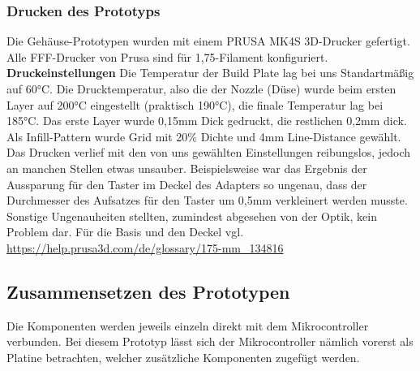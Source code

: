\documentclass[]{article}
\begin{document}
\subsubsection{Drucken des Prototyps}
Die Gehäuse-Prototypen wurden mit einem \glqq PRUSA MK4S\grqq{} 3D-Drucker gefertigt. Alle FFF-Drucker von Prusa sind für 1,75-Filament konfiguriert.
\vspace{4mm}\newline
\textbf{Druckeinstellungen} \newline
Die Temperatur der Build Plate lag bei uns Standartmäßig auf 60°C. Die Drucktemperatur, also die der Nozzle (Düse) wurde beim ersten Layer auf 200°C eingestellt (praktisch 190°C), die finale Temperatur lag bei 185°C. \newline
Das erste Layer wurde 0,15mm Dick gedruckt, die restlichen 0,2mm dick. \newline
Als Infill-Pattern wurde \glqq Grid\grqq{} mit 20\% Dichte und 4mm Line-Distance gewählt. \newline
Das Drucken verlief mit den von uns gewählten Einstellungen reibungslos, jedoch an manchen Stellen etwas unsauber. Beispielsweise war das Ergebnis der Aussparung für den Taster im Deckel des Adapters so ungenau, dass der Durchmesser des Aufsatzes für den Taster um 0,5mm verkleinert werden musste. Sonstige Ungenauheiten stellten, zumindest abgesehen von der Optik, kein Problem dar. \newline
Für die Basis und den Deckel
\vspace{4mm}\newline
vgl. \url{https://help.prusa3d.com/de/glossary/175-mm_134816}
\subsection{Zusammensetzen des Prototypen}
Die Komponenten werden jeweils einzeln direkt mit dem Mikrocontroller verbunden. Bei diesem Prototyp lässt sich der Mikrocontroller nämlich vorerst als Platine betrachten, welcher zusätzliche Komponenten zugefügt werden.
\end{document}
